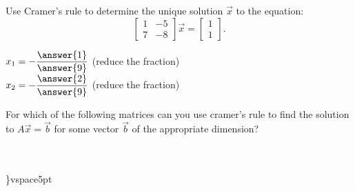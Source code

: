 \documentclass{ximera}
\begin{document}
      \begin{question} Use Cramer's rule to determine the unique solution $\vec{x}$ to the equation: $$\begin{bmatrix} 1 & -5 \\ 7& -8 \end{bmatrix}\vec{x} = \begin{bmatrix} 1\\1\end{bmatrix}.$$
      	
      	$x_1=-\dfrac{\answer{1}}{\answer{9}}$ (reduce the fraction)\vspace{10pt}\\
      	$x_2=-\dfrac{\answer{2}}{\answer{9}}$ (reduce the fraction)\vspace{10pt}\\
      	
      	
      	
      	
      \end{question}	
       \begin{question} For which of the following matrices can you use cramer's rule to find the solution to $A\vec{x} = \vec{b}$ for some vector $\vec{b}$ of the appropriate dimension? 
       	
       	\begin{multipleChoice}
       		\vspace{5pt}\\
       			 \vspace{5pt}\\
       			 \}vspace{5pt}\\
       		\end{multipleChoice}
       	
       	
     
       \end{question}	
\end{document}
